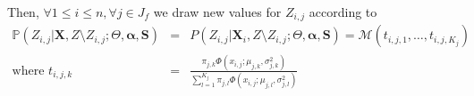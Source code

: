 \documentclass[12pt,a4paper]{report}
\begin{document}

	Then, $\forall 1\leq i \leq n, \forall j \in J_f$ we draw new values for $Z_{i,j}$ according to
	\begin{eqnarray}
		\mathbb{P}(Z_{i,j}|\boldsymbol{X},Z\setminus Z_{i,j};\Theta,\boldsymbol{\alpha},\boldsymbol{S})&=&P(Z_{i,j}|\boldsymbol{X}_i,Z\setminus Z_{i,j};\Theta,\boldsymbol{\alpha},\boldsymbol{S})=\mathcal{M}(t_{i,j,1},\dots ,t_{i,j,K_j}) \\
		\textrm{where } t_{i,j,k}&=&\frac{\pi_{j,k}\Phi(x_{i,j};\mu_{j,k},\sigma_{j,k}^2)}{\sum_{l=1}^{K_j}\pi_{j,l}\Phi(x_{i,j};\mu_{j,l},\sigma_{j,l}^2) }
	\end{eqnarray}
		
\end{document}
